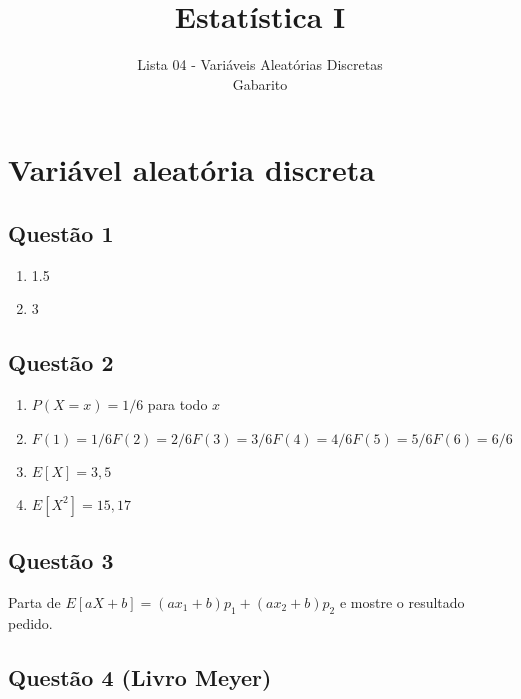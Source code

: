 \documentclass[
]{article}
\title{Estatística I}
\subtitle{Lista 04 - Variáveis Aleatórias Discretas\\
Gabarito}
\author{}
\date{\vspace{-2.5em}}
\begin{document}
\maketitle

\hypertarget{variuxe1vel-aleatuxf3ria-discreta}{%
\section{Variável aleatória
discreta}\label{variuxe1vel-aleatuxf3ria-discreta}}

\hypertarget{questuxe3o-1}{%
\subsection{Questão 1}\label{questuxe3o-1}}

\begin{enumerate}
\def\labelenumi{\alph{enumi})}
\item
  1.5
\item
  3
\end{enumerate}

\hypertarget{questuxe3o-2}{%
\subsection{Questão 2}\label{questuxe3o-2}}

\begin{enumerate}
\def\labelenumi{\alph{enumi})}
\item
  \(P(X=x) = 1/6\) para todo \(x\)
\item
  \(F(1) = 1/6 F(2) = 2/6 F(3) = 3/6 F(4) = 4/6 F(5) = 5/6 F(6) = 6/6\)
\item
  \(E[X] = 3,5\)
\item
  \(E[X^2] = 15,17\)
\end{enumerate}

\hypertarget{questuxe3o-3}{%
\subsection{Questão 3}\label{questuxe3o-3}}

Parta de \(E[aX+b] = (ax_1 + b)p_1 + (ax_2 + b)p_2\) e mostre o
resultado pedido.

\hypertarget{questuxe3o-4-livro-meyer}{%
\subsection{Questão 4 (Livro Meyer)}\label{questuxe3o-4-livro-meyer}}
\end{document}
